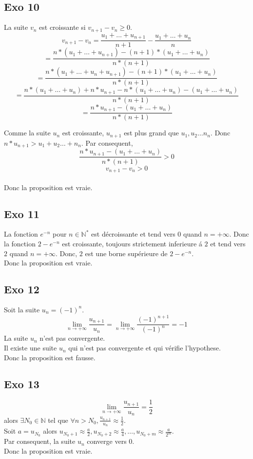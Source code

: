 \documentclass[]{book}
\theoremstyle{definition}
\begin{document}
\subsection*{Exo 10}
La suite $v_n$ est croissante si $v_{n+1} -v_n  \geq 0$.
$$v_{n+1} -v_n = \frac{u_1+ \ldots +u_{n+1}}{n+1} - \frac{u_1+ \ldots +u_{n}}{n}$$
$$= \frac{n*(u_1+ \ldots +u_{n+1}) - (n+1)*(u_1+ \ldots +u_{n})}  {n*(n+1)}$$
$$= \frac{n*(u_1+ \ldots +u_{n}+u_{n+1}) - (n+1)*(u_1+ \ldots +u_{n})}  {n*(n+1)}$$
$$= \frac{n*(u_1+ \ldots +u_n) + n*u_{n+1} - n*(u_1+ \ldots +u_{n}) - (u_1+ \ldots +u_{n})}  {n*(n+1)}$$
$$= \frac{ n*u_{n+1} - (u_1+ \ldots +u_{n})}  {n*(n+1)}$$

Comme la suite $u_n$ est croissante, $u_{n+1}$ est plus grand que $u_{1}, u_{2} \ldots n_{n}$. Donc $n*u_{n+1} > u_{1}+ u_{2} \ldots +n_{n}$. Par consequent,
$$\frac{ n*u_{n+1} - (u_1+ \ldots +u_{n})}  {n*(n+1)} > 0$$
$$v_{n+1} -v_n  > 0$$
\\ 
Donc la proposition est vraie.

\subsection*{Exo 11}
La fonction $e^{-n}$ pour $n \in \mathbb{N}^*$ est d\'ecroissante et tend vers $0$ quand $n=+\infty$. Donc la fonction $2-e^{-n}$ est croissante, toujours strictement inferieure \'a $2$ et tend vers $2$ quand $n=+\infty$. Donc, $2$ est une borne sup\'erieure de $2-e^{-n}$.
\\ 
Donc la proposition est vraie.

\subsection*{Exo 12}
Soit la suite $u_{n} = (-1)^n$.
$$\lim_{n \to +\infty} \frac{u_{n+1}}{u_{n}} = \lim_{n \to +\infty} \frac{(-1)^{n+1}}{(-1)^n}=-1$$
La suite $u_{n}$ n'est pas convergente. \\
Il existe une suite $u_n$ qui n'est pas convergente et qui v\'erifie l'hypothese. \\ 
Donc la proposition est fausse.

\subsection*{Exo 13}
$$\lim_{n \to +\infty} \frac{u_{n+1}}{u_{n}} = \frac{1}{2}$$ 
alors $\exists N_0 \in \mathbb{N}$ tel que $\forall n > N_{0}, \frac{u_{n+1}}{u_{n}} \approx \frac{1}{2}$. \\
Soit $a = u_{N_0}$ alors $u_{N_0+1} \approx \frac{a}{2}, u_{N_0+2} \approx \frac{a}{4}, \ldots , u_{N_0+m} \approx \frac{a}{2^{m}}$. \\
Par consequent, la suite $u_n$ converge vers $0$.
\\ 
Donc la proposition est vraie.
\end{document}
